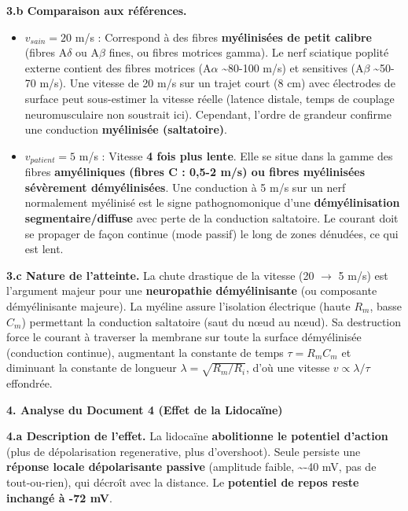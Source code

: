 \documentclass[11pt]{article}
\begin{document}
\begin{exoresolu}
\textbf{3.b Comparaison aux références.}
\begin{itemize}
    \item $v_{sain} = 20$ m/s : Correspond à des fibres \textbf{myélinisées de petit calibre} (fibres A$\delta$ ou A$\beta$ fines, ou fibres motrices gamma). Le nerf sciatique poplité externe contient des fibres motrices (A$\alpha$ \textasciitilde 80-100 m/s) et sensitives (A$\beta$ \textasciitilde 50-70 m/s). Une vitesse de 20 m/s sur un trajet court (8 cm) avec électrodes de surface peut sous-estimer la vitesse réelle (latence distale, temps de couplage neuromusculaire non soustrait ici). Cependant, l'ordre de grandeur confirme une conduction \textbf{myélinisée (saltatoire)}.
    \item $v_{patient} = 5$ m/s : Vitesse \textbf{4 fois plus lente}. Elle se situe dans la gamme des fibres \textbf{amyéliniques (fibres C : 0,5-2 m/s) ou fibres myélinisées sévèrement démyélinisées}. Une conduction à 5 m/s sur un nerf normalement myélinisé est le signe pathognomonique d'une \textbf{démyélinisation segmentaire/diffuse} avec perte de la conduction saltatoire. Le courant doit se propager de façon continue (mode passif) le long de zones dénudées, ce qui est lent.
\end{itemize}

\textbf{3.c Nature de l'atteinte.}
La chute drastique de la vitesse (20 $\to$ 5 m/s) est l'argument majeur pour une \textbf{neuropathie démyélinisante} (ou composante démyélinisante majeure). La myéline assure l'isolation électrique (haute $R_m$, basse $C_m$) permettant la conduction saltatoire (saut du nœud au nœud). Sa destruction force le courant à traverser la membrane sur toute la surface démyélinisée (conduction continue), augmentant la constante de temps $\tau = R_m C_m$ et diminuant la constante de longueur $\lambda = \sqrt{R_m / R_i}$, d'où une vitesse $v \propto \lambda / \tau$ effondrée.

\textbf{4. Analyse du Document 4 (Effet de la Lidocaïne)}

\textbf{4.a Description de l'effet.}
La lidocaïne \textbf{abolitionne le potentiel d'action} (plus de dépolarisation regenerative, plus d'overshoot). Seule persiste une \textbf{réponse locale dépolarisante passive} (amplitude faible, \textasciitilde -40 mV, pas de tout-ou-rien), qui décroît avec la distance. Le \textbf{potentiel de repos reste inchangé à -72 mV}.


\end{exoresolu}
\end{document}
